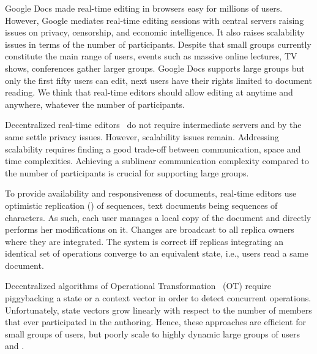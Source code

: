 
Google Docs made real-time editing in browsers easy for millions of
users. However, Google mediates real-time editing sessions with central servers
raising issues on privacy, censorship, and economic intelligence. It also raises
scalability issues in terms of the number of participants.  Despite that small
groups currently constitute the main range of users, events such as massive
online lectures, TV shows, conferences gather larger groups.  Google Docs
supports large groups but only the first fifty users can edit, next users have
their rights limited to document reading.  We think that real-time editors
should allow editing at anytime and anywhere, whatever the number of
participants.


Decentralized real-time editors~\cite{oster2006data, sun1998operational,
  sun2009contextbased} do not require intermediate servers and by the same
settle privacy issues. However, scalability issues remain.  Addressing
scalability requires finding a good trade-off between communication, space and
time complexities. Achieving a sublinear communication complexity compared to
the number of participants is crucial for supporting large groups.


To provide availability and responsiveness of documents, real-time editors use
optimistic replication (\REF) of sequences, text documents being sequences of
characters. As such, each user manages a local copy of the document and directly
performs her modifications on it. Changes are broadcast to all replica owners
where they are integrated. The system is correct iff replicas integrating an
identical set of operations converge to an equivalent state, i.e., users read a
same document. 

Decentralized algorithms of Operational
Transformation~\cite{sun2009contextbased} (OT) require piggybacking a state or a
context vector in order to detect concurrent operations. Unfortunately, state
vectors grow linearly with respect to the number of members that ever
participated in the authoring. Hence, these approaches are efficient for small
groups of users, but poorly scale to highly dynamic large groups of users and
.

